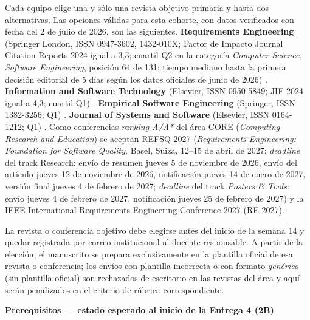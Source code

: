 \documentclass[11pt,a4paper]{article}
\newcounter{secc}
\newcommand{\secband}[1]{%
    \stepcounter{secc}\par\vspace{9pt}\noindent
    {\setlength{\fboxsep}{0pt}%
        \colorbox{uteqgold}{\parbox[c][20pt][c]{0.05\textwidth}{\centering\textbf{\color{white}\small \arabic{secc}}}}%
        \colorbox{uteqgreen}{\parbox[c][20pt][c]{0.95\textwidth}{\hspace{8pt}\textbf{\color{white}\small #1}}}%
    }\par\vspace{5pt}}
\begin{document}
\begin{pubbox}[title=Revistas JCR y conferencias objetivo verificadas al momento del corte]
    Cada equipo elige una y sólo una revista objetivo primaria y hasta dos alternativas.
    Las opciones válidas para esta cohorte, con datos verificados con fecha del 2 de julio de 2026, son las siguientes.
    \textbf{Requirements Engineering} (Springer London, ISSN 0947-3602, 1432-010X; Factor de Impacto Journal Citation Reports 2024 igual a 3,3; cuartil Q2 en la categoría \emph{Computer Science, Software Engineering}, posición 64 de 131; tiempo mediano hasta la primera decisión editorial de 5 días según los datos oficiales de junio de 2026) \cite{req_eng_journal_2025}.
    \textbf{Information and Software Technology} (Elsevier, ISSN 0950-5849; JIF 2024 igual a 4,3; cuartil Q1) \cite{ist_journal_2025}.
    \textbf{Empirical Software Engineering} (Springer, ISSN 1382-3256; Q1) \cite{ese_journal_2025}.
    \textbf{Journal of Systems and Software} (Elsevier, ISSN 0164-1212; Q1) \cite{jss_journal_2025}.
    Como conferencias \emph{ranking A/A*} del área CORE (\emph{Computing Research and Education}) se aceptan REFSQ 2027 (\emph{Requirements Engineering: Foundation for Software Quality}, Basel, Suiza, 12--15 de abril de 2027; \emph{deadline} del track Research: envío de resumen jueves 5 de noviembre de 2026, envío del artículo jueves 12 de noviembre de 2026, notificación jueves 14 de enero de 2027, versión final jueves 4 de febrero de 2027; \emph{deadline} del track \emph{Posters \& Tools}: envío jueves 4 de febrero de 2027, notificación jueves 25 de febrero de 2027) \cite{refsq2027_dates} y la IEEE International Requirements Engineering Conference 2027 (RE 2027).
\end{pubbox}

\begin{alertbox}[title=Regla decisiva sobre la revista objetivo]
    La revista o conferencia objetivo debe elegirse antes del inicio de la semana 14 y quedar registrada por correo institucional al docente responsable.
    A partir de la elección, el manuscrito se prepara exclusivamente en la plantilla oficial de esa revista o conferencia; los envíos con plantilla incorrecta o con formato \emph{genérico} (sin plantilla oficial) son rechazados de escritorio en las revistas del área y aquí serán penalizados en el criterio de rúbrica correspondiente.
\end{alertbox}

\secband{Prerequisitos --- estado esperado al inicio de la Entrega 4 (2B)}
\end{document}
